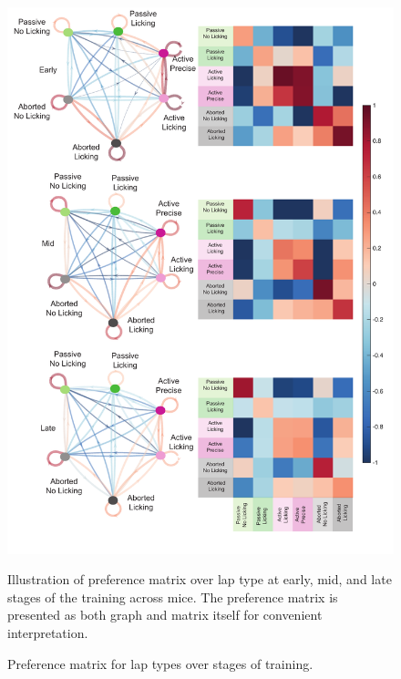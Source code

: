 \begin{figure}
    \centering
    \includegraphics[width=1\linewidth]{figures//Chapter 3 Behaviour//Thesis Figures//figure_PDFs/fig5_preference_index_each_stage.pdf}
    \caption{Preference matrix for lap types over stages of training.}
\medskip
\small
Illustration of preference matrix over lap type at early, mid, and late stages of the training across mice. The preference matrix is presented as both graph and matrix itself for convenient interpretation.
    \label{fig:preference matrices over learning}
\end{figure}



